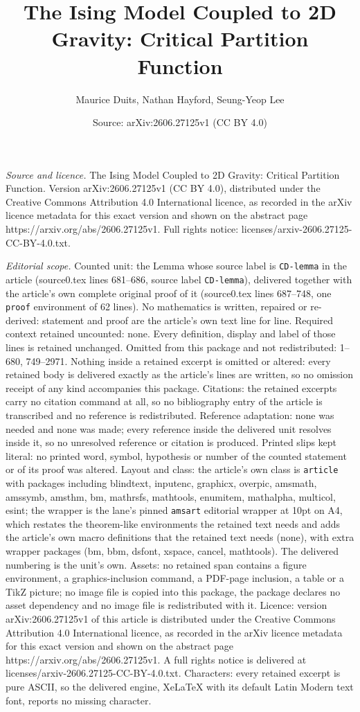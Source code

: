 \documentclass[10pt,a4paper]{amsart}
\title[The Ising Model Coupled to 2D Gravity: Critical Partition Fu]{The Ising Model Coupled to 2D Gravity: Critical Partition Function}
\author{Maurice Duits, Nathan Hayford, Seung-Yeop Lee}
\date{Source: arXiv:2606.27125v1 (CC BY 4.0)}
\begin{document}
\maketitle

\noindent\emph{Source and licence.} The Ising Model Coupled to 2D Gravity: Critical Partition Function. Version arXiv:2606.27125v1 (CC BY 4.0), distributed under the Creative Commons Attribution 4.0 International licence, as recorded in the arXiv licence metadata for this exact version and shown on the abstract page https://arxiv.org/abs/2606.27125v1. Full rights notice: licenses/arxiv-2606.27125-CC-BY-4.0.txt.\par\smallskip

\noindent\textit{Editorial scope.} Counted unit: the Lemma whose source label is \texttt{CD-lemma} in the article (source0.tex lines 681--686, source label \texttt{CD-lemma}), delivered together with the article's own complete original proof of it (source0.tex lines 687--748, one \texttt{proof} environment of 62 lines). No mathematics is written, repaired or re-derived: statement and proof are the article's own text line for line. Required context retained uncounted: none. Every definition, display and label of those lines is retained unchanged. Omitted from this package and not redistributed: 1--680, 749--2971. Nothing inside a retained excerpt is omitted or altered: every retained body is delivered exactly as the article's lines are written, so no omission receipt of any kind accompanies this package. Citations: the retained excerpts carry no citation command at all, so no bibliography entry of the article is transcribed and no reference is redistributed. Reference adaptation: none was needed and none was made; every reference inside the delivered unit resolves inside it, so no unresolved reference or citation is produced. Printed slips kept literal: no printed word, symbol, hypothesis or number of the counted statement or of its proof was altered. Layout and class: the article's own class is \texttt{article} with packages including blindtext, inputenc, graphicx, overpic, amsmath, amssymb, amsthm, bm, mathrsfs, mathtools, enumitem, mathalpha, multicol, esint; the wrapper is the lane's pinned \texttt{amsart} editorial wrapper at 10pt on A4, which restates the theorem-like environments the retained text needs and adds the article's own macro definitions that the retained text needs (none), with extra wrapper packages (bm, bbm, dsfont, xspace, cancel, mathtools). The delivered numbering is the unit's own. Assets: no retained span contains a figure environment, a graphics-inclusion command, a PDF-page inclusion, a table or a TikZ picture; no image file is copied into this package, the package declares no asset dependency and no image file is redistributed with it. Licence: version arXiv:2606.27125v1 of this article is distributed under the Creative Commons Attribution 4.0 International licence, as recorded in the arXiv licence metadata for this exact version and shown on the abstract page https://arxiv.org/abs/2606.27125v1. A full rights notice is delivered at licenses/arxiv-2606.27125-CC-BY-4.0.txt. Characters: every retained excerpt is pure ASCII, so the delivered engine, XeLaTeX with its default Latin Modern text font, reports no missing character.
\end{document}

